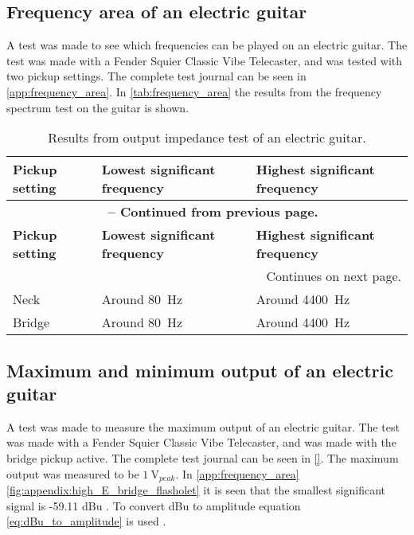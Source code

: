 \subsection{Frequency area of an electric guitar}
A test was made to see which frequencies can be played on an electric guitar. The test was made with a Fender Squier Classic Vibe Telecaster, and was tested with two pickup settings. The complete test journal can be seen in \autoref{app:frequency_area}. In \autoref{tab:frequency_area} the results from the frequency spectrum test on the guitar is shown.

\begin{longtable}[h!]{ |m{}| 
          m{}| 
          m{}|   } 
\caption{Results from output impedance test of an electric guitar.} \label{tab:frequency_area} \\ 
 
\hline 
\textbf{Pickup setting} & \textbf{Lowest significant frequency} & \textbf{Highest significant frequency} \\ 
\hline 
\endfirsthead     
\multicolumn{3}{c}{{{\footnotesize \bfseries \tablename\ \thetable{} -- Continued from previous page.}}} \\  
\hline 
\textbf{Pickup setting} & \textbf{Lowest significant frequency} & \textbf{Highest significant frequency} \\ 
\hline 
\endhead       
\hline \multicolumn{3}{|r|}{{Continues on next page.}} \\ \hline 
\endfoot     
\hline 
\endlastfoot 
Neck & Around \SI{80}{\hertz} & Around \SI{4400}{\hertz} \\ \hline
Bridge & Around \SI{80}{\hertz}  & Around \SI{4400}{\hertz}\\ \hline
\end{longtable}

\subsection{Maximum and minimum output of an electric guitar}
A test was made to measure the maximum output of an electric guitar. The test was made with a Fender Squier Classic Vibe Telecaster, and was made with the bridge pickup active. The complete test journal can be seen in \autoref{}. The maximum output was measured to be $\SI{1}{\volt}_{peak}$.
In \ref{app:frequency_area} \ref{fig:appendix:high_E_bridge_flasholet} it is seen that the smallest significant signal is -59.11 dBu . To convert dBu to amplitude equation \ref{eq:dBu_to_amplitude} is used \citep{dB}.

